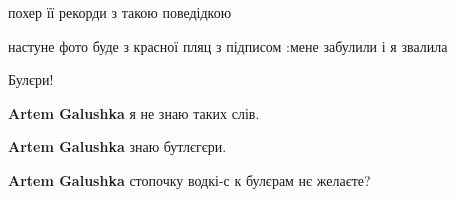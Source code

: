\begin{itemize}
 
похер її рекорди з такою поведідкою

 
настуне фото буде з красної пляц з підписом :мене забулили і я звалила

 
Булєри!

\begin{itemize} %
 
\textbf{Artem Galushka} я не знаю таких слів.


 
\textbf{Artem Galushka} знаю бутлєгєри.

 
\textbf{Artem Galushka} стопочку водкі-с
к булєрам нє желаєте?

 

\end{itemize}
\end{itemize}

